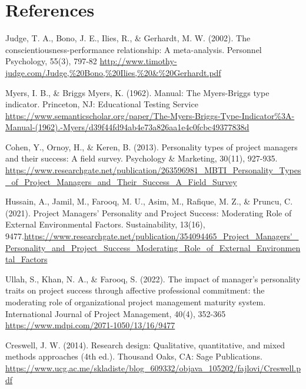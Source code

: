 \section{References}

    \begin{enumerate}[label={[\arabic*]}]
    
        
        \item Judge, T. A., Bono, J. E., Ilies, R., \& Gerhardt, M. W. (2002). The conscientiousness-performance relationship: A meta-analysis. Personnel Psychology, 55(3), 797-82 \url{http://www.timothy-judge.com/Judge,%20Bono,%20Ilies,%20&%20Gerhardt.pdf}

        \item Myers, I. B., \& Briggs Myers, K. (1962). Manual: The Myers-Briggs type indicator. Princeton, NJ: Educational Testing Service \url{https://www.semanticscholar.org/paper/The-Myers-Briggs-Type-Indicator%3A-Manual-(1962).-Myers/d39f44fd94ab4e73a826aa1e4c0fcbc49377838d}

        \item \label{itm:third} Cohen, Y., Ornoy, H., \& Keren, B. (2013). Personality types of project managers and their success: A field survey. Psychology \& Marketing, 30(11), 927-935. \url{https://www.researchgate.net/publication/263596981_MBTI_Personality_Types_of_Project_Managers_and_Their_Success_A_Field_Survey}

        \item \label{itm:fourth} Hussain, A., Jamil, M., Farooq, M. U., Asim, M., Rafique, M. Z., \& Pruncu, C. (2021). Project Managers’ Personality and Project Success: Moderating Role of External Environmental Factors. Sustainability, 13(16), 9477.\url{https://www.researchgate.net/publication/354094465_Project_Managers'_Personality_and_Project_Success_Moderating_Role_of_External_Environmental_Factors}

        \item \label{itm:fifth} Ullah, S., Khan, N. A., \& Farooq, S. (2022). The impact of manager's personality traits on project success through affective professional commitment: the moderating role of organizational project management maturity system. International Journal of Project Management, 40(4), 352-365 \url{https://www.mdpi.com/2071-1050/13/16/9477}

        \item \label{itm:sixth} Creswell, J. W. (2014). Research design: Qualitative, quantitative, and mixed methods approaches (4th ed.). Thousand Oaks, CA: Sage Publications. \url{https://www.ucg.ac.me/skladiste/blog_609332/objava_105202/fajlovi/Creswell.pdf}


\end{enumerate}
